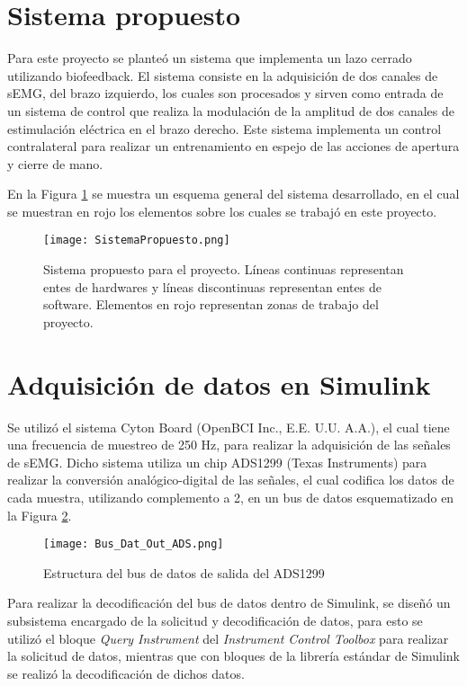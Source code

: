\section{Sistema propuesto}
Para este proyecto se planteó un sistema que implementa un lazo cerrado utilizando biofeedback. El sistema consiste en la adquisición de dos canales de sEMG, del brazo izquierdo, los cuales son procesados y sirven como entrada de un sistema de control que realiza la modulación de la amplitud de dos canales de estimulación eléctrica en el brazo derecho. Este sistema implementa un control contralateral para realizar un entrenamiento en espejo de las acciones de apertura y cierre de mano.

En la Figura \ref{Figura: SistProp} se muestra un esquema general del sistema desarrollado, en el cual se muestran en rojo los elementos sobre los cuales se trabajó en este proyecto.

\begin{figure}[htbp]
\centering
	\texttt{[image: SistemaPropuesto.png]}
	\caption{Sistema propuesto para el proyecto. Líneas continuas representan entes de hardwares y líneas discontinuas representan entes de software. Elementos en rojo representan zonas de trabajo del proyecto.}
	\label{Figura: SistProp}
\end{figure}

\section{Adquisición de datos en Simulink}
Se utilizó el sistema Cyton Board (OpenBCI Inc., E.E. U.U. A.A.), el cual tiene una frecuencia de muestreo de 250 Hz, para realizar la adquisición de las señales de sEMG. Dicho sistema utiliza un chip ADS1299 (Texas Instruments) para realizar la conversión analógico-digital de las señales, el cual codifica los datos de cada muestra, utilizando complemento a 2, en un bus de datos esquematizado en la Figura \ref{Figura: BusOut}.

\begin{figure}[htbp]
\centering
	\texttt{[image: Bus\_Dat\_Out\_ADS.png]}
	\caption{Estructura del bus de datos de salida del ADS1299}
	\label{Figura: BusOut}
\end{figure}

Para realizar la decodificación del bus de datos dentro de Simulink, se diseñó un subsistema encargado de la solicitud y decodificación de datos, para esto se utilizó el bloque \emph{Query Instrument} del \emph{Instrument Control Toolbox} para realizar la solicitud de datos, mientras que con bloques de la librería estándar de Simulink se realizó la decodificación de dichos datos.

